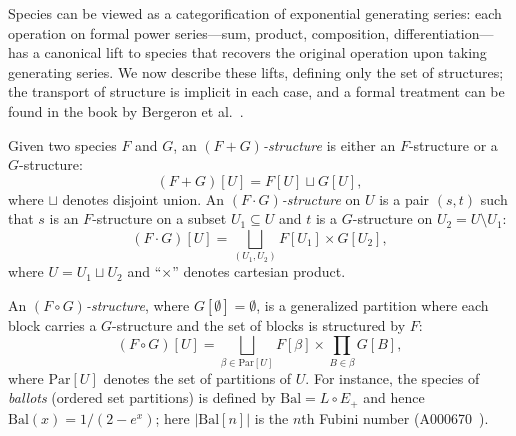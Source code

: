 \documentclass[a4paper,11pt,UKenglish]{article}
\newcommand{\Set}{E}
\newcommand{\Lin}{L}
\newcommand{\Sym}{\mathcal{S}}
\newcommand{\Par}{\mathrm{Par}}
\newcommand{\Bal}{\mathrm{Bal}}
\theoremstyle{definition}
\newtheorem{example}[theorem]{Example}
\begin{document}
% 
%

Species can be viewed as a categorification of exponential generating
series: each operation on formal power series---sum, product,
composition, differentiation---has a canonical lift to species that
recovers the original operation upon taking generating series. We
now describe these lifts, defining only the set of structures; the
transport of structure is implicit in each case, and a formal
treatment can be found in the book by Bergeron et al.~\cite{BLL}.

Given two species $F$ and $G$, an \emph{$(F+G)$-structure} is either an
$F$-structure or a $G$-structure:
\[
  (F+G)[U]=F[U] \sqcup G[U],
\]
where $\sqcup$ denotes disjoint union. An \emph{$(F\cdot G)$-structure}
on $U$ is a pair $(s,t)$ such that $s$ is an $F$-structure on a subset
$U_1\subseteq U$ and $t$ is a $G$-structure on $U_2=U\setminus U_1$:
\[
(F \cdot G)[U] = \bigsqcup_{(U_1,U_2)} F[U_1] \times G[U_2],
\]
where $U=U_1 \sqcup U_2$ and ``$\times$'' denotes cartesian product.

An \emph{$(F\circ G)$-structure}, where
$G[\emptyset] = \emptyset$, is a generalized partition where each block
carries a $G$-structure and the set of blocks is structured by $F$:
\[
(F \circ G)[U] = \bigsqcup_{\beta\in\Par[U]}
F[\beta]\times \prod_{B\in\beta}G[B],
\]
where $\Par[U]$ denotes the set of partitions of $U$.  For instance, the
species of \emph{ballots} (ordered set partitions) is defined by
$\Bal = \Lin\circ\Set_+$ and hence $\Bal(x)=1/(2-e^x)$; here
$|\Bal[n]|$ is the $n$th Fubini number (A000670~\cite{Sl}).
\end{document}
